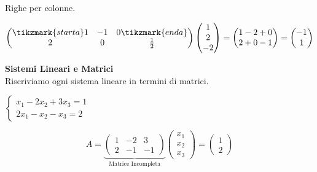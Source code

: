\textsf{\small Righe per colonne.}
\begin{comment}
\begin{align}
	P^+ &= \begin{pmatrix}
		1 & 0 \\
		0 & 0
	\end{pmatrix}
	&
	P^- &= \begin{pmatrix}
		0 & 0 \\
		0 & 1
	\end{pmatrix}
\end{align}
\end{comment}

\[
\begin{pmatrix}
\tikzmark{starta}1 & -1 & 0\tikzmark{enda} \\
2 & 0 & \frac{1}{2}
\end{pmatrix}
\begin{pmatrix}
1 \\ 2 \\ -2
\end{pmatrix}
=
\begin{pmatrix}
1 - 2 + 0 \\
2 + 0 - 1 
\end{pmatrix}
=
\begin{pmatrix}
-1 \\
1
\end{pmatrix}
\]


{\bf Sistemi Lineari e Matrici} \\
\textsf{\small Riscriviamo ogni sistema lineare in termini di matrici.}

\(
\begin{cases*}
x_1 - 2x_2 + 3x_3 = 1 \\
2x_1 - x_2 - x_3 = 2
\end{cases*}
\)

\enlargethispage{5\linewidth}
\[
A =
\underbrace{
\begin{pmatrix}
	1 & -2 & 3\\
	2 & -1 & -1
\end{pmatrix}
} _{\text{Matrice Incompleta}}
\begin{pmatrix}
	x_1 \\ x_2 \\ x_3
\end{pmatrix}
=
\begin{pmatrix}
	1 \\
	2
\end{pmatrix}
\]

